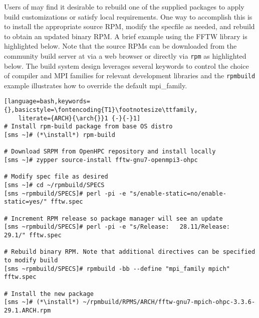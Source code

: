 Users of \OHPC{} may find it desirable to rebuild one of the supplied packages
to apply build customizations or satisfy local requirements. One way to
accomplish this is to install the appropriate source RPM, modify the specfile
as needed, and rebuild to obtain an updated binary RPM. A brief example using
the FFTW library is highlighted below.  Note that the source RPMs can be downloaded from the
community build server at \href{https://build.openhpc.community}
{\color{blue}{https://build.openhpc.community}} via a web browser or directly
via \texttt{rpm} as highlighted below. The \OHPC{} build system design
leverages several keywords to control the choice of compiler and MPI families
for relevant development libraries and the \texttt{rpmbuild} example
illustrates how to override the default mpi\_family.

\begin{lstlisting}[language=bash,keywords={},basicstyle=\fontencoding{T1}\footnotesize\ttfamily,
    literate={ARCH}{\arch{}}1 {-}{-}1]
# Install rpm-build package from base OS distro
[sms ~]# (*\install*) rpm-build

# Download SRPM from OpenHPC repository and install locally
[sms ~]# zypper source-install fftw-gnu7-openmpi3-ohpc

# Modify spec file as desired
[sms ~]# cd ~/rpmbuild/SPECS
[sms ~rpmbuild/SPECS]# perl -pi -e "s/enable-static=no/enable-static=yes/" fftw.spec

# Increment RPM release so package manager will see an update
[sms ~rpmbuild/SPECS]# perl -pi -e "s/Release:   28.11/Release:   29.1/" fftw.spec

# Rebuild binary RPM. Note that additional directives can be specified to modify build
[sms ~rpmbuild/SPECS]# rpmbuild -bb --define "mpi_family mpich" fftw.spec

# Install the new package
[sms ~]# (*\install*) ~/rpmbuild/RPMS/ARCH/fftw-gnu7-mpich-ohpc-3.3.6-29.1.ARCH.rpm
\end{lstlisting}
